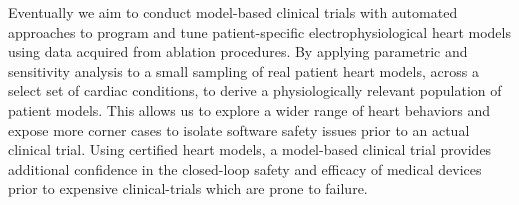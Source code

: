 

Eventually we aim to conduct model-based clinical trials with automated approaches to program and tune patient-specific electrophysiological heart models using data acquired from ablation procedures. By applying parametric and sensitivity analysis to a small sampling of real patient heart models, across a select set of cardiac conditions, to derive a physiologically relevant population of patient models. This allows us to explore a wider range of heart behaviors and expose more corner cases to isolate software safety issues prior to an actual clinical trial. Using certified heart models, a model-based clinical trial provides additional confidence in the closed-loop safety and efficacy of medical devices prior to expensive clinical-trials which are prone to failure. 

